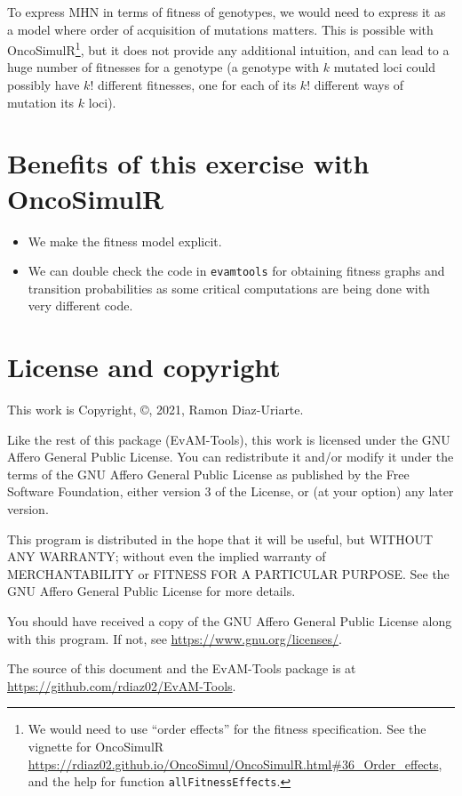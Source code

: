 \documentclass[11pt]{article}
\begin{document}
To express MHN in terms of fitness of genotypes, we would need to express it as a model where order of acquisition of mutations matters. This is possible with OncoSimulR\footnote{We would need to use ``order effects'' for the fitness specification. See the vignette for OncoSimulR  \url{https://rdiaz02.github.io/OncoSimul/OncoSimulR.html\#36\_Order\_effects},  and the help for function \texttt{allFitnessEffects}.
}, but it does not provide any additional intuition, and can lead to a huge number of fitnesses for a genotype (a genotype with $k$ mutated loci could possibly have $k!$ different fitnesses, one for each of its $k!$ different ways of mutation its $k$ loci).


\section{Benefits of this exercise with OncoSimulR}
\label{sec:org4a55091}
\begin{itemize}
\item We make the fitness model explicit.
\item We can double check the code in \texttt{evamtools} for obtaining fitness graphs and transition probabilities as some critical computations are being done with very different code.
\end{itemize}



\section{License and copyright}
This work is Copyright, \copyright, 2021, Ramon Diaz-Uriarte.

Like the rest of this package (EvAM-Tools), this work is licensed under the GNU Affero General Public License. You can redistribute it and/or modify it under the terms of the GNU Affero General Public License as published by the Free Software Foundation, either version 3 of the License, or (at your option) any later version.

This program is distributed in the hope that it will be useful, but WITHOUT ANY WARRANTY; without even the implied warranty of MERCHANTABILITY or FITNESS FOR A PARTICULAR PURPOSE. See the GNU Affero General Public License for more details.

You should have received a copy of the GNU Affero General Public License along with this program. If not, see \url{https://www.gnu.org/licenses/}. 

The source of this document and the EvAM-Tools package is at \url{https://github.com/rdiaz02/EvAM-Tools}.
\end{document}
